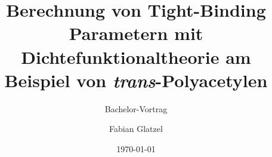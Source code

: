 \documentclass[11pt]{beamer}
\begin{document}
\author{Fabian Glatzel}
\title{Berechnung von Tight-Binding Parametern mit Dichtefunktionaltheorie am Beispiel von \emph{trans}-Polyacetylen}
\subtitle{Bachelor-Vortrag}
\date{\today}
\begin{frame}[plain]
	\maketitle
\end{frame}

\begin{frame}
	\frametitle{}
\end{frame}
\end{document}
